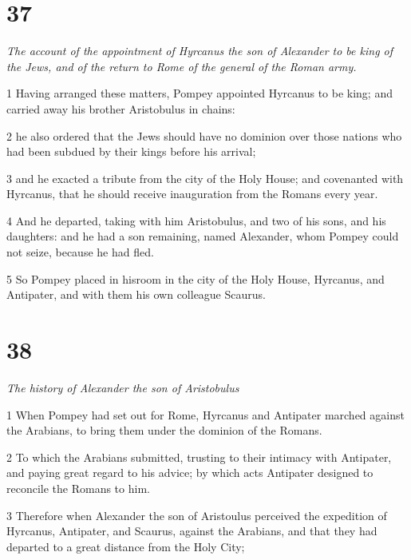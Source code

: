 \chapter{37}

\par \textit{The account of the appointment of Hyrcanus the son of Alexander to be king of the Jews, and of the return to Rome of the general of the Roman army.}

\par 1 Having arranged these matters, Pompey appointed Hyrcanus to be king; and carried away his brother Aristobulus in chains:

\par 2 he also ordered that the Jews should have no dominion over those nations who had been subdued by their kings before his arrival; 

\par 3 and he exacted a tribute from the city of the Holy House; and covenanted with Hyrcanus, that he should receive inauguration from the Romans every year. 

\par 4 And he departed, taking with him Aristobulus, and two of his sons, and his daughters: and he had a son remaining, named Alexander, whom Pompey could not seize, because he had fled. 

\par 5 So Pompey placed in hisroom in the city of the Holy House, Hyrcanus, and Antipater, and with them his own colleague Scaurus.

\chapter{38}

\par \textit{The history of Alexander the son of Aristobulus}

\par 1 When Pompey had set out for Rome, Hyrcanus and Antipater marched against the Arabians, to bring them under the dominion of the Romans. 

\par 2 To which the Arabians submitted, trusting to their intimacy with Antipater, and paying great regard to his advice; by which acts Antipater designed to reconcile the Romans to him. 

\par 3 Therefore when Alexander the son of Aristoulus perceived the expedition of Hyrcanus, Antipater, and Scaurus, against the Arabians, and that they had departed to a great distance from the Holy City; 

